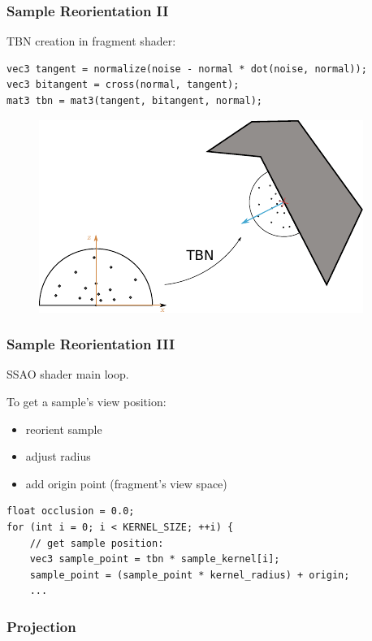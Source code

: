 \documentclass{beamer}
\begin{document}
\begin{frame}[fragile]
\frametitle{Sample Reorientation II}

TBN creation in fragment shader:
\begin{verbatim}
vec3 tangent = normalize(noise - normal * dot(noise, normal));
vec3 bitangent = cross(normal, tangent);
mat3 tbn = mat3(tangent, bitangent, normal);
\end{verbatim}

\begin{figure}
    \includegraphics[width=0.7\linewidth]{images/kernel_reorientation.pdf}
    \centering
\end{figure}

\end{frame}

\begin{frame}[fragile]
\frametitle{Sample Reorientation III}
SSAO shader main loop.

To get a sample's view position:
\begin{itemize}
    \item reorient sample
    \item adjust radius
    \item add origin point (fragment's view space)
\end{itemize}
\begin{verbatim}
float occlusion = 0.0;
for (int i = 0; i < KERNEL_SIZE; ++i) {
    // get sample position:
    vec3 sample_point = tbn * sample_kernel[i];
    sample_point = (sample_point * kernel_radius) + origin;
    ...
\end{verbatim}

\end{frame}

\begin{frame}
\frametitle{Projection}

\end{frame}
\end{document}
